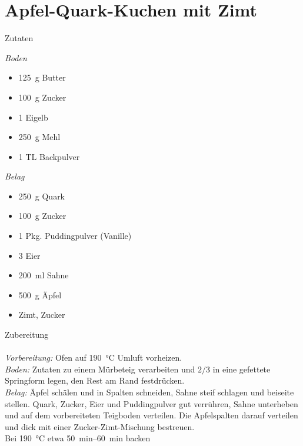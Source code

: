 \section*{Apfel-Quark-Kuchen mit Zimt}
\ihead{}\ohead{}
\cfoot{}
{\Large Zutaten}
\begin{multicols}{2}
\textit{Boden}
\begin{itemize}
    \item \SI{125}{g} Butter
    \item \SI{100}{g} Zucker
    \item \num{1} Eigelb
    \item \SI{250}{g} Mehl
    \item \num{1} TL Backpulver
\end{itemize}
\columnbreak
\textit{Belag}
\begin{itemize}
    \item \SI{250}{g} Quark
    \item \SI{100}{g} Zucker
    \item \num{1} Pkg. Puddingpulver (Vanille)
    \item \num{3} Eier
    \item \SI{200}{ml} Sahne
    \item \SI{500}{g} Äpfel
    \item Zimt, Zucker
\end{itemize}
\end{multicols}
\noindent
{\Large Zubereitung}\\
\\
\textit{Vorbereitung:} Ofen auf \SI{190}{\celsius} Umluft vorheizen.\\
\textit{Boden:} Zutaten zu einem Mürbeteig verarbeiten und $2/3$ in eine gefettete Springform legen, den Rest am Rand festdrücken.\\
\textit{Belag:} Äpfel schälen und in Spalten schneiden, Sahne steif schlagen und beiseite stellen.
Quark, Zucker, Eier und Puddingpulver gut verrühren, Sahne unterheben und auf dem vorbereiteten Teigboden verteilen.
Die Apfelspalten darauf verteilen und dick mit einer Zucker-Zimt-Mischung bestreuen.\\
Bei \SI{190}{\celsius} etwa \SIrange{50}{60}{min} backen